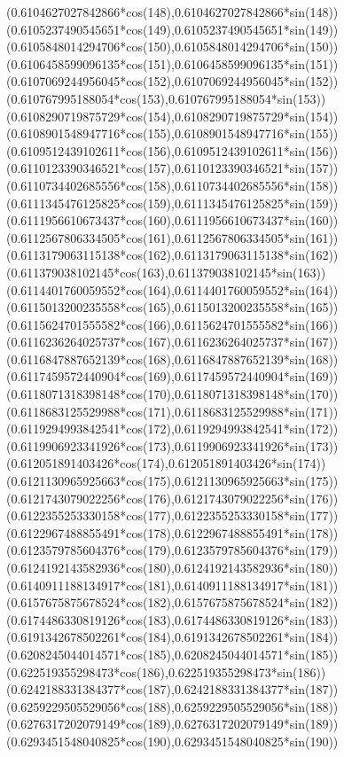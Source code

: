 {({0.6104627027842866*cos(148)},{0.6104627027842866*sin(148)})
({0.6105237490545651*cos(149)},{0.6105237490545651*sin(149)})
({0.6105848014294706*cos(150)},{0.6105848014294706*sin(150)})
({0.6106458599096135*cos(151)},{0.6106458599096135*sin(151)})
({0.6107069244956045*cos(152)},{0.6107069244956045*sin(152)})
({0.610767995188054*cos(153)},{0.610767995188054*sin(153)})
({0.6108290719875729*cos(154)},{0.6108290719875729*sin(154)})
({0.6108901548947716*cos(155)},{0.6108901548947716*sin(155)})
({0.6109512439102611*cos(156)},{0.6109512439102611*sin(156)})
({0.6110123390346521*cos(157)},{0.6110123390346521*sin(157)})
({0.6110734402685556*cos(158)},{0.6110734402685556*sin(158)})
({0.6111345476125825*cos(159)},{0.6111345476125825*sin(159)})
({0.6111956610673437*cos(160)},{0.6111956610673437*sin(160)})
({0.6112567806334505*cos(161)},{0.6112567806334505*sin(161)})
({0.6113179063115138*cos(162)},{0.6113179063115138*sin(162)})
({0.611379038102145*cos(163)},{0.611379038102145*sin(163)})
({0.6114401760059552*cos(164)},{0.6114401760059552*sin(164)})
({0.6115013200235558*cos(165)},{0.6115013200235558*sin(165)})
({0.6115624701555582*cos(166)},{0.6115624701555582*sin(166)})
({0.6116236264025737*cos(167)},{0.6116236264025737*sin(167)})
({0.6116847887652139*cos(168)},{0.6116847887652139*sin(168)})
({0.6117459572440904*cos(169)},{0.6117459572440904*sin(169)})
({0.6118071318398148*cos(170)},{0.6118071318398148*sin(170)})
({0.6118683125529988*cos(171)},{0.6118683125529988*sin(171)})
({0.6119294993842541*cos(172)},{0.6119294993842541*sin(172)})
({0.6119906923341926*cos(173)},{0.6119906923341926*sin(173)})
({0.612051891403426*cos(174)},{0.612051891403426*sin(174)})
({0.6121130965925663*cos(175)},{0.6121130965925663*sin(175)})
({0.6121743079022256*cos(176)},{0.6121743079022256*sin(176)})
({0.6122355253330158*cos(177)},{0.6122355253330158*sin(177)})
({0.6122967488855491*cos(178)},{0.6122967488855491*sin(178)})
({0.6123579785604376*cos(179)},{0.6123579785604376*sin(179)})
({0.6124192143582936*cos(180)},{0.6124192143582936*sin(180)})
({0.6140911188134917*cos(181)},{0.6140911188134917*sin(181)})
({0.6157675875678524*cos(182)},{0.6157675875678524*sin(182)})
({0.6174486330819126*cos(183)},{0.6174486330819126*sin(183)})
({0.6191342678502261*cos(184)},{0.6191342678502261*sin(184)})
({0.6208245044014571*cos(185)},{0.6208245044014571*sin(185)})
({0.622519355298473*cos(186)},{0.622519355298473*sin(186)})
({0.6242188331384377*cos(187)},{0.6242188331384377*sin(187)})
({0.6259229505529056*cos(188)},{0.6259229505529056*sin(188)})
({0.6276317202079149*cos(189)},{0.6276317202079149*sin(189)})
({0.6293451548040825*cos(190)},{0.6293451548040825*sin(190)})
}
